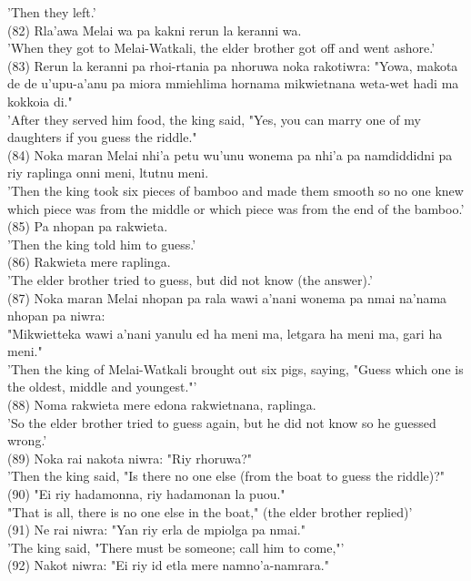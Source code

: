 \documentclass[10pt]{article}
\begin{document}
'Then they left.'\\
(82) Rla'awa Melai wa pa kakni rerun la keranni wa.\\
'When they got to Melai-Watkali, the elder brother got off and went ashore.'\\
(83) Rerun la keranni pa rhoi-rtania pa nhoruwa noka rakotiwra: "Yowa, makota de de u'upu-a'anu pa miora mmiehlima hornama mikwietnana weta-wet hadi ma kokkoia di."\\
'After they served him food, the king said, "Yes, you can marry one of my daughters if you guess the riddle."\\
(84) Noka maran Melai nhi'a petu wu'unu wonema pa nhi'a pa namdiddidni pa riy raplinga onni meni, ltutnu meni.\\
'Then the king took six pieces of bamboo and made them smooth so no one knew which piece was from the middle or which piece was from the end of the bamboo.'\\
(85) Pa nhopan pa rakwieta.\\
'Then the king told him to guess.'\\
(86) Rakwieta mere raplinga.\\
'The elder brother tried to guess, but did not know (the answer).'\\
(87) Noka maran Melai nhopan pa rala wawi a'nani wonema pa nmai na'nama nhopan pa niwra:\\
"Mikwietteka wawi a'nani yanulu ed ha meni ma, letgara ha meni ma, gari ha meni."\\
'Then the king of Melai-Watkali brought out six pigs, saying, "Guess which one is the oldest, middle and youngest."'\\
(88) Noma rakwieta mere edona rakwietnana, raplinga.\\
'So the elder brother tried to guess again, but he did not know so he guessed wrong.'\\
(89) Noka rai nakota niwra: "Riy rhoruwa?"\\
'Then the king said, "Is there no one else (from the boat to guess the riddle)?"\\
(90) "Ei riy hadamonna, riy hadamonan la puou."\\
"That is all, there is no one else in the boat," (the elder brother replied)'\\
(91) Ne rai niwra: "Yan riy erla de mpiolga pa nmai."\\
'The king said, "There must be someone; call him to come,"'\\
(92) Nakot niwra: "Ei riy id etla mere namno'a-namrara."\\
\end{document}
